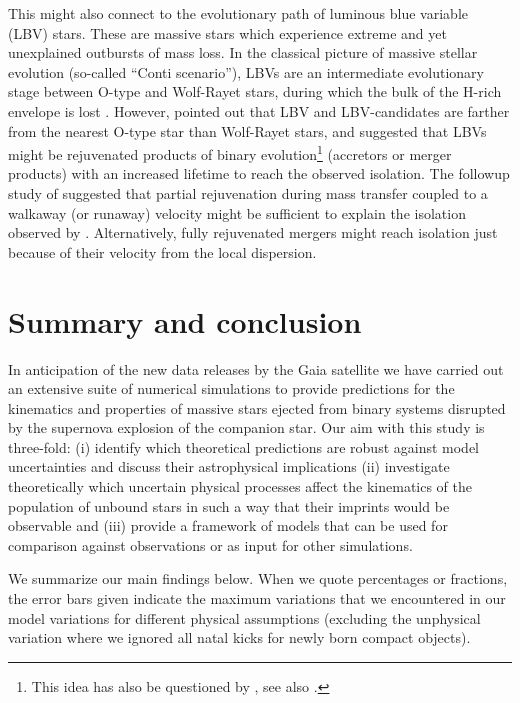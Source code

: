 \documentclass{aa}
\begin{document}
This might also connect to the evolutionary path of luminous blue
variable (LBV) stars. These are massive stars which experience
extreme and yet unexplained outbursts of mass loss. In the classical
picture of massive stellar evolution (so-called ``Conti scenario''),
LBVs are an intermediate evolutionary stage between O-type and Wolf-Rayet
stars, during which the bulk of the H-rich envelope is lost \citep[e.g.][]{conti:75,
  maeder:94,maeder:96}. However, \cite{smith:15}
pointed out that LBV and LBV-candidates are farther from the nearest
O-type star than Wolf-Rayet stars, and suggested that LBVs might be rejuvenated products of binary
evolution\footnote{This idea has also be questioned by
  \cite{humphreys:16,davidson:16}, see also \cite{smith:16}.} (accretors or merger
products) with an increased lifetime to reach the observed isolation. The followup study of \cite{aghakhanlootakanloo:17}
suggested that partial rejuvenation during mass transfer coupled to a walkaway (or
runaway) velocity might be sufficient to explain the isolation
observed by \cite{smith:15}. Alternatively, fully rejuvenated mergers
might reach isolation just because of their velocity from the local dispersion. 


\section{Summary and conclusion}
\label{sec:conclusion}

In anticipation of the new data releases by the Gaia satellite we have
carried out an extensive suite of numerical simulations to provide
predictions for the kinematics and properties of massive stars ejected
from binary systems disrupted by the supernova explosion of the
companion star. Our aim with this study is three-fold:  (i) identify
which theoretical predictions are robust against model uncertainties
and discuss their astrophysical implications (ii)  investigate
theoretically which uncertain physical processes affect the kinematics
of the population of unbound stars in such a way that their imprints
would be observable and  (iii) provide a framework of models that can
be used for comparison against observations or as input for
other simulations. 

We summarize our main findings below. When we quote percentages or fractions, the error bars given indicate the maximum variations that we encountered in our model variations for different physical assumptions (excluding the unphysical variation where we ignored all natal kicks for newly born compact objects).
\end{document}
